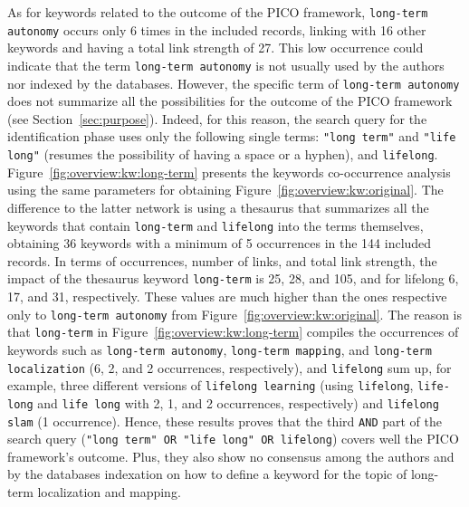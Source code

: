 As for keywords related to the outcome of the PICO framework, \texttt{long-term autonomy} occurs only 6 times in the included records, linking with 16 other keywords and having a total link strength of 27. This low occurrence could indicate that the term \texttt{long-term autonomy} is not usually used by the authors nor indexed by the databases. 
However, the specific term of \texttt{long-term autonomy} does not summarize all the possibilities for the outcome of the PICO framework (see Section~\ref{sec:purpose}). Indeed, for this reason, the search query for the identification phase uses only the following single terms: \texttt{"long term"} and \texttt{"life long"} (resumes the possibility of having a space or a hyphen), and \texttt{lifelong}.
Figure~\ref{fig:overview:kw:long-term} presents the keywords co-occurrence analysis using the same parameters for obtaining Figure~\ref{fig:overview:kw:original}. The difference to the latter network is using a thesaurus that summarizes all the keywords that contain \texttt{long-term} and \texttt{lifelong} into the terms themselves, obtaining 36 keywords with a minimum of 5 occurrences in the 144 included records.
In terms of occurrences, number of links, and total link strength, the impact of the thesaurus keyword \texttt{long-term} is 25, 28, and 105, and for lifelong 6, 17, and 31, respectively. These values are much higher than the ones respective only to \texttt{long-term autonomy} from Figure~\ref{fig:overview:kw:original}.
The reason is that \texttt{long-term} in Figure~\ref{fig:overview:kw:long-term} compiles the occurrences of keywords such as \texttt{long-term autonomy}, \texttt{long-term mapping}, and \texttt{long-term localization} (6, 2, and 2 occurrences, respectively), and \texttt{lifelong} sum up, for example, three different versions of \texttt{lifelong learning} (using \texttt{lifelong}, \texttt{life-long} and \texttt{life long} with 2, 1, and 2 occurrences, respectively) and \texttt{lifelong slam} (1 occurrence). Hence, these results proves that the third \texttt{AND} part of the search query (\texttt{"long term" OR "life long" OR lifelong}) covers well the PICO framework's outcome. Plus, they also show no consensus among the authors and by the databases indexation on how to define a keyword for the topic of long-term localization and mapping.

